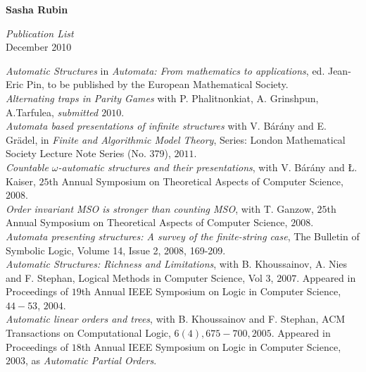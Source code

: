 \documentclass[a4paper]{article}
\begin{document}
\begin{center}
{\Huge \bf Sasha Rubin}
\end{center}

\begin{center}
{\huge \it Publication List} \\
\vspace{1em}
{\large December 2010}
\end {center}


{\it Automatic Structures} in {\it Automata: From mathematics to applications}, ed. Jean-Eric Pin, to be published by the European Mathematical Society.\\

{\it Alternating traps in Parity Games} with P. Phalitnonkiat, A. Grinshpun, A.Tarfulea, {\it submitted $2010$}.\\

{\it Automata based presentations of infinite structures} with V. B{\'a}r{\'a}ny and E. Gr{\"a}del,
in {\it Finite and Algorithmic Model Theory},
Series: London Mathematical Society Lecture Note Series (No. 379), $2011$.\\

{\it Countable $\omega$-automatic structures and their presentations}, with V.  B{\'a}r{\'a}ny and \L. Kaiser, 
$25$th Annual Symposium on Theoretical Aspects of Computer Science, $2008$.  \\

{\it Order invariant MSO is stronger than counting MSO}, with T. Ganzow, 
$25$th Annual Symposium on Theoretical Aspects of Computer Science, $2008$.  \\

{\it Automata presenting structures: A survey of the finite-string case}, The Bulletin of Symbolic Logic, 
Volume 14, Issue 2, 2008, 169-209.\\

{\it Automatic Structures: Richness and Limitations}, with B. Khoussainov, A. Nies and F. Stephan, 
Logical Methods in Computer Science, Vol $3$, $2007$. Appeared in Proceedings of 
$19$th Annual {IEEE} Symposium on Logic in Computer Science, $44-53$, $2004$. \\

{\it Automatic linear orders and trees}, with B. Khoussainov and F. Stephan, 
ACM Transactions on Computational Logic,
$6 (4), 675-700, 2005$. Appeared in 
Proceedings of $18$th Annual IEEE Symposium on Logic in Computer Science, $2003$,
as {\it Automatic Partial Orders}.  \\
\end{document}
